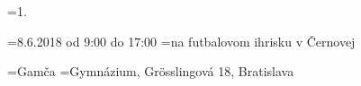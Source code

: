 \rocnik={1.}                                 %

\kedy={8.6.2018 od 9:00 do 17:00}
\kde={na futbalovom ihrisku v Černovej}

\tim={Gamča}
\skola={Gymnázium, Grösslingová 18, Bratislava}